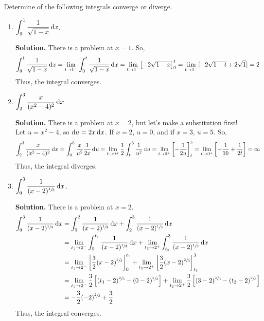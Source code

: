 \begin{Example}{}{}
    Determine of the following integrals converge or diverge.
    \begin{enumerate}[label=(\roman*)]
        \item $ \displaystyle \int_{0}^{1} \frac{1}{\sqrt{1-x}} \odif{x} $.

            \textbf{Solution.} There is a problem at $ x=1 $. So,
            \[ \int_{0}^{1} \frac{1}{\sqrt{1-x}} \odif{x}
                =\lim\limits_{{t} \to {1^-}} \int_{0}^{t} \frac{1}{\sqrt{1-x}} \odif{x}
                =\lim\limits_{{t} \to {1^-}}\bigl[-2\sqrt{1-x}\bigr]_0^t
                =\lim\limits_{{t} \to {1^-}}[-2\sqrt{1-t}+2\sqrt{1}]
                =2
            \]
            Thus, the integral converges.
        \item $ \displaystyle \int_{2}^{3} \frac{x}{(x^2-4)^2}\odif{x}  $

            \textbf{Solution.} There is a problem at $ x=2 $,
            but let's make a substitution first! Let $ u=x^2-4 $, so $ \odif{u}=2x\odif{x} $. If $ x=2 $,
            $ u=0 $, and if $ x=3 $, $ u=5 $. So,
            \[ \int_{2}^{3} \frac{x}{(x^2-4)^2}\odif{x}
                =\int_{0}^{5} \frac{x}{u^2} \frac{1}{2x} \odif{u}
                =\lim\limits_{{t} \to {0^+}} \frac{1}{2} \int_{t}^{5} \frac{1}{u^2}\odif{u}
                =\lim\limits_{{t} \to {0^+}}\left[-\frac{1}{2u} \right]_t^5
                =\lim\limits_{{t} \to {0^+}}\left[ -\frac{1}{10} +\frac{1}{2t} \right]
                =\infty
            \]
            Thus, the integral diverges.
        \item $ \displaystyle \int_{0}^{3} \frac{1}{(x-2)^{\sfrac{1}{3} }}\odif{x}  $.

            \textbf{Solution.} There is a problem at $ x=2 $.
            \begin{align*}
                \int_{0}^{3} \frac{1}{(x-2)^{\sfrac{1}{3} }}\odif{x}
                & =\int_{0}^{2} \frac{1}{(x-2)^{\sfrac{1}{3}}} \odif{x}+\int_{2}^{3} \frac{1}{(x-2)^{\sfrac{1}{3} }} \odif{x} \\
                & =\lim\limits_{{t_1} \to {2^-}} \int_{0}^{t_1} \frac{1}{(x-2)^{\sfrac{1}{3}}}  \odif{x} +
                \lim\limits_{{t_2} \to {2^+}} \int_{t_2}^{3} \frac{1}{(x-2)^{\sfrac{1}{3}}} \odif{x}                           \\
                & =\lim\limits_{{t_1} \to {2^-}} \left[ \frac{3}{2}(x-2)^{\sfrac{2}{3}}\right]_0^{t_1}+
                \lim\limits_{{t_2} \to {2^+}}\left[ \frac{3}{2}(x-2)^{\sfrac{2}{3}}\right]_{t_2}^{3}                           \\
                & =\lim\limits_{{t_1} \to {2^-}} \frac{3}{2} \left[ (t_1-2)^{\sfrac{2}{3}} -(0-2)^{\sfrac{2}{3}}\right]
                +\lim\limits_{{t_2} \to {2^+}} \frac{3}{2} \left[ (3-2)^{\sfrac{2}{3}}-(t_2-2)^{\sfrac{2}{3}} \right]          \\
                & =-\frac{3}{2} (-2)^{\sfrac{2}{3}}+\frac{3}{2}
            \end{align*}
            Thus, the integral converges.
    \end{enumerate}
\end{Example}


